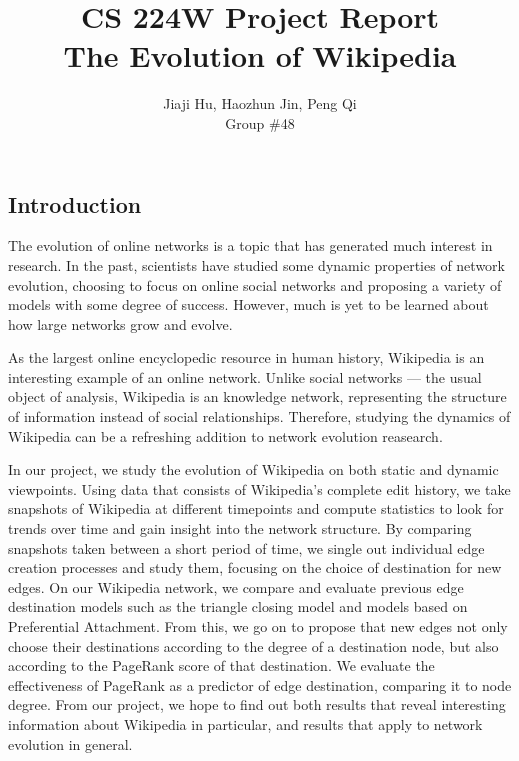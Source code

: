 \documentclass[10pt]{article}
\begin{document}
\title{CS 224W Project Report\\ The Evolution of Wikipedia}
\author{Jiaji Hu, Haozhun Jin, Peng Qi\\Group \#48}
\date{}
\maketitle

\begin{multicols}{2}
\section{Introduction}

The evolution of online networks is a topic that has generated much interest in research. In the past, scientists have studied some dynamic properties of network evolution, choosing to focus on online social networks and proposing a variety of models with some degree of success. However, much is yet to be learned about how large networks grow and evolve.

As the largest online encyclopedic resource in human history, Wikipedia is an interesting example of an online network. Unlike social networks --- the usual object of analysis, Wikipedia is an knowledge network, representing the structure of information instead of social relationships. Therefore, studying the dynamics of Wikipedia can be a refreshing addition to network evolution reasearch.

In our project, we study the evolution of Wikipedia on both static and dynamic viewpoints. Using data that consists of Wikipedia's complete edit history, we take snapshots of Wikipedia at different timepoints and compute statistics to look for trends over time and gain insight into the network structure. By comparing snapshots taken between a short period of time, we single out individual edge creation processes and study them, focusing on the choice of destination for new edges. On our Wikipedia network, we compare and evaluate previous edge destination models such as the triangle closing model and models based on Preferential Attachment. From this, we go on to propose that new edges not only choose their destinations according to the degree of a destination node, but also according to the PageRank score of that destination. We evaluate the effectiveness of PageRank as a predictor of edge destination, comparing it to node degree. From our project, we hope to find out both results that reveal interesting information about Wikipedia in particular, and results that apply to network evolution in general.


\end{multicols}
\end{document}
